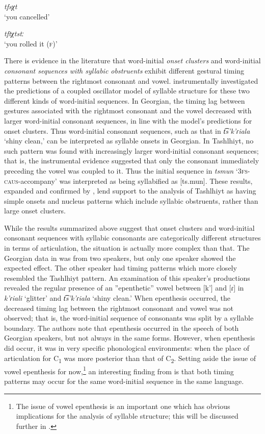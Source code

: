 \ea\label{ex:2.5}
\ea  \textit{tfsχt}\\
\glt ‘you cancelled’

\ex  \textit{tftχtstː}\\
\glt ‘you rolled it (\textsc{f})’

  \citep[95]{Ridouane2002}
\z
\z

  There is evidence in the literature that word-initial \textit{onset clusters} and word-initial \textit{consonant sequences with syllabic obstruents} exhibit different gestural timing patterns between the rightmost consonant and vowel. \citet{GoldsteinEtAl2007} instrumentally investigated the predictions of a coupled oscillator model of syllable structure for these two different kinds of word-initial sequences. In Georgian, the timing lag between gestures associated with the rightmost consonant and the vowel decreased with larger word-initial consonant sequences, in line with the model’s predictions for onset clusters. Thus word-initial consonant sequences, such as that in \textit{t͡s’k’ɾiala} ‘shiny clean,’ can be interpreted as syllable onsets in Georgian. In Tashlhiyt, no such pattern was found with increasingly larger word-initial consonant sequences; that is, the instrumental evidence suggested that only the consonant immediately preceding the vowel was coupled to it. Thus the initial sequence in \textit{tsmun} ‘\textsc{3fs}-\textsc{caus}-accompany’ was interpreted as being syllabified as [ts.mun]. These results, expanded and confirmed by \citet{HermesEtAl2011}, lend support to the analysis of Tashlhiyt as having simple onsets and nucleus patterns which include syllabic obstruents, rather than large onset clusters.

  While the results summarized above suggest that onset clusters and word-initial consonant sequences with syllabic consonants are categorically different structures in terms of articulation, the situation is actually more complex than that. The Georgian data in \citet{GoldsteinEtAl2007} was from two speakers, but only one speaker showed the expected effect. The other speaker had timing patterns which more closely resembled the Tashlhiyt pattern. An examination of this speaker’s productions revealed the regular presence of an ”epenthetic” vowel between [k’] and [ɾ] in \textit{k'ɾiali} ‘glitter’ and \textit{t͡s’k’ɾiala} ‘shiny clean.’ When epenthesis occurred, the decreased timing lag between the rightmost consonant and vowel was not observed; that is, the word-initial sequence of consonants was split by a syllable boundary. The authors note that epenthesis occurred in the speech of both Georgian speakers, but not always in the same forms. However, when epenthesis did occur, it was in very specific phonological environments: when the place of articulation for C\textsubscript{1} was more posterior than that of C\textsubscript{2}. Setting aside the issue of vowel epenthesis for now,\footnote{{The issue of vowel epenthesis is an important one which has obvious implications for the analysis of syllable structure; this will be discussed further in .}} an interesting finding from \citet{GoldsteinEtAl2007} is that both timing patterns may occur for the same word-initial sequence in the same language.

